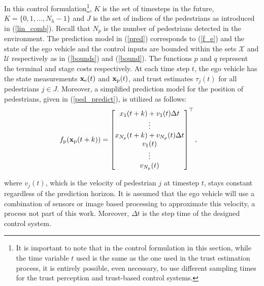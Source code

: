 \documentclass[journal]{IEEEtran}
\begin{document}
In this control formulation\footnote{It is important to note that in the control formulation in this section, while the time variable $t$ used is the same as the one used in the trust estimation process, it is entirely possible, even necessary, to use different sampling times for the trust perception and trust-based control systems.}, $K$ is the set of timesteps in the future, $K = \{0, 1, \hdots, N_h-1\}$ and $J$ is the set of indices of the pedestrians as introduced in (\ref{lin_comb}). Recall that $N_p$ is the number of pedestrians detected in the environment. The prediction model in (\ref{pred}) corresponds to (\ref{f_e}) and the state of the ego vehicle and the control inputs are bounded within the sets $\mathcal{X}$ and $\mathcal{U}$ respectively as in (\ref{bounds}) and (\ref{bound}). The functions $p$ and $q$ represent the terminal and stage costs respectively. At each time step $t$, the ego vehicle has the state measurements $\mathbf{x}_{\rm e}(t)$ and $\mathbf{x}_{\rm p}(t)$, and trust estimates $\tau_j(t)$ for all pedestrians $j \in J$. Moreover, a simplified prediction model for the position of pedestrians, given in (\ref{ped_predict}), is utilized as follows:
\begin{align}
    f_{\rm p}(\mathbf{x}_{\rm p}(t + k)) &=\begin{bmatrix}
           x_1(t+k) + v_{1}(t)\Delta t\\
           \vdots \\
           x_{N_p}(t+k) + v_{N_p}(t)\Delta t\\
           v_{1}(t)\\
           \vdots \\
           v_{N_p}(t)
         \end{bmatrix}^\top,
\end{align}


where $v_{j}(t)$, which is the velocity of pedestrian $j$ at timestep $t$, stays constant regardless of the prediction horizon. It is assumed that the ego vehicle will use a combination of sensors or image based processing to approximate this velocity, a process not part of this work. Moreover, $\Delta t$ is the step time of the designed control system.
\end{document}
